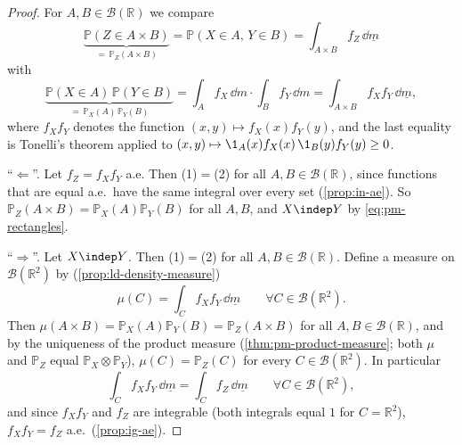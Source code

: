 \begin{proof}
For $A,B\in\mathcal B(\mathbb R)$ we compare
\[
  \underbrace{\mathbb P(Z\in A\times B)}_{=\,\mathbb P_Z(A\times B)}=\mathbb P(X\in A,\,Y\in B)
  =\int_{A\times B}f_Z\,\dd\underline m\tag{1}
\]
with
\[
  \underbrace{\mathbb P(X\in A)\,\mathbb P(Y\in B)}_{=\,\mathbb P_X(A)\,\mathbb P_Y(B)}
  =\int_Af_X\,\dd m\cdot\int_Bf_Y\,\dd m=\int_{A\times B}f_Xf_Y\,\dd\underline m,\tag{2}
\]
where $f_Xf_Y$ denotes the function $(x,y)\mapsto f_X(x)f_Y(y)$, and the last equality is
Tonelli's theorem applied to $(x,y)\mapsto\1_A(x)f_X(x)\,\1_B(y)f_Y(y)\ge0$.

``$\Leftarrow$''. Let $f_Z=f_Xf_Y$ a.e. Then (1)$=$(2) for all $A,B\in\mathcal B(\mathbb R)$,
since functions that are equal a.e.\ have the same integral over every set
(\cref{prop:in-ae}). So
$\mathbb P_Z(A\times B)=\mathbb P_X(A)\mathbb P_Y(B)$ for all $A,B$, and $X\indep Y$ by
\eqref{eq:pm-rectangles}.

``$\Rightarrow$''. Let $X\indep Y$. Then (1)$=$(2) for all $A,B\in\mathcal B(\mathbb R)$.
Define a measure on $\mathcal B(\mathbb R^2)$ by (\cref{prop:ld-density-measure})
\[
  \mu(C)=\int_Cf_Xf_Y\,\dd\underline m\qquad\forall C\in\mathcal B(\mathbb R^2).
\]
Then $\mu(A\times B)=\mathbb P_X(A)\mathbb P_Y(B)=\mathbb P_Z(A\times B)$ for all
$A,B\in\mathcal B(\mathbb R)$, and by the uniqueness of the product measure
(\cref{thm:pm-product-measure}; both $\mu$ and $\mathbb P_Z$ equal
$\mathbb P_X\otimes\mathbb P_Y$), $\mu(C)=\mathbb P_Z(C)$ for every
$C\in\mathcal B(\mathbb R^2)$. In particular
\[
  \int_Cf_Xf_Y\,\dd\underline m=\int_Cf_Z\,\dd\underline m\qquad\forall C\in\mathcal B(\mathbb R^2),
\]
and since $f_Xf_Y$ and $f_Z$ are integrable (both integrals equal $1$ for $C=\mathbb R^2$),
$f_Xf_Y=f_Z$ a.e.\ (\cref{prop:ig-ae}).
\end{proof}

